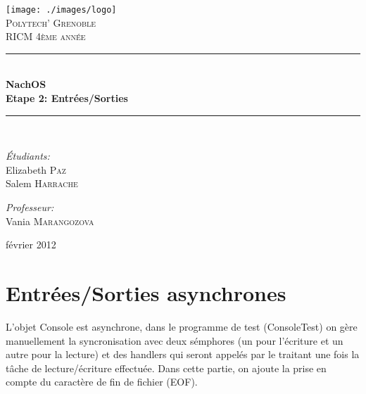\documentclass[a4paper,10pt]{article}
\newcommand{\HRule}{\rule{\linewidth}{0.5mm}}
\begin{document}
\begin{titlepage}

\begin{center}


\texttt{[image: ./images/logo]}\\[1cm]

\textsc{\LARGE Polytech' Grenoble}\\[1.5cm]

\textsc{\Large RICM 4\`eme ann\'ee}\\[1.2cm]


\HRule \\[0.4cm]
{ \huge \bfseries NachOS\\[0.6cm]
Etape 2: Entrées/Sorties}
\\[0.4cm]

\HRule \\[2cm]

\begin{minipage}{0.4\textwidth}
\begin{flushleft} \large
\emph{\'Etudiants:}\\
Elizabeth \textsc{Paz} \\
Salem \textsc{Harrache}
\end{flushleft}
\end{minipage}
\begin{minipage}{0.4\textwidth}
\begin{flushright} \large
\emph{Professeur:} \\
Vania \textsc{Marangozova}
\end{flushright}
\end{minipage}

\vfill

{\large  février 2012}

\end{center}

\end{titlepage}

\section{Entrées/Sorties asynchrones}

L'objet Console est asynchrone, dans le programme de test (ConsoleTest) on
gère manuellement la syncronisation avec deux sémphores (un pour l'écriture et
un autre pour la lecture) et des handlers qui seront appelés par le traitant
une fois la tâche de lecture/écriture effectuée. Dans cette partie, on ajoute la
prise en compte du caractère de fin de fichier (EOF).
\end{document}
